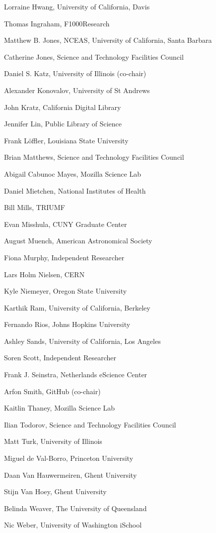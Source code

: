 \documentclass[11pt, oneside]{amsart}
\begin{document}
Lorraine Hwang, University of California,  Davis	

Thomas Ingraham, F1000Research	

Matthew B. Jones, NCEAS, University of California,  Santa Barbara	

Catherine Jones, Science and Technology Facilities Council

Daniel S. Katz, University of Illinois (co-chair)

Alexander Konovalov, University of St Andrews

John Kratz, California Digital Library	

Jennifer Lin, Public Library of Science	

Frank L\"offler, Louisiana State University	

Brian Matthews, Science and Technology Facilities Council	

Abigail Cabunoc Mayes, Mozilla Science Lab	

Daniel Mietchen, National Institutes of Health	

Bill Mills, TRIUMF

Evan Misshula, CUNY Graduate Center	

August Muench, American Astronomical Society	

Fiona Murphy, Independent Researcher	

Lars Holm Nielsen, CERN	

Kyle Niemeyer, Oregon State University	

Karthik Ram, University of California, Berkeley	

Fernando Rios, Johns Hopkins University	

Ashley Sands, University of California, Los Angeles	

Soren Scott, Independent Researcher

Frank J. Seinstra, Netherlands eScience Center

Arfon Smith, GitHub (co-chair)

Kaitlin Thaney, Mozilla Science Lab

Ilian Todorov, Science and Technology Facilities Council

Matt Turk, University of Illinois

Miguel de Val-Borro, Princeton University

Daan Van Hauwermeiren, Ghent University

Stijn Van Hoey, Ghent University

Belinda Weaver, The University of Queensland

Nic Weber, University of Washington iSchool



\end{document}
